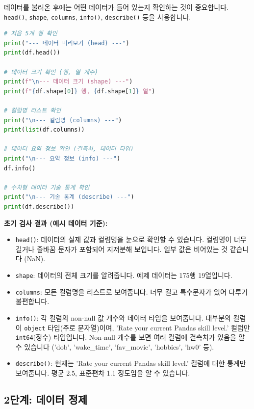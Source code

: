 \documentclass[11pt,a4paper]{book}
\theoremstyle{definition}
\begin{document}
데이터를 불러온 후에는 어떤 데이터가 들어 있는지 확인하는 것이 중요합니다. \texttt{head()}, \texttt{shape}, \texttt{columns}, \texttt{info()}, \texttt{describe()} 등을 사용합니다.

\begin{codeexamplebox}
\begin{lstlisting}[language=Python, caption={데이터 초기 검사}, label={lst:initial_inspection}, breaklines=true]
# 처음 5개 행 확인
print("--- 데이터 미리보기 (head) ---")
print(df.head())

# 데이터 크기 확인 (행, 열 개수)
print(f"\n--- 데이터 크기 (shape) ---")
print(f"{df.shape[0]} 행, {df.shape[1]} 열")

# 컬럼명 리스트 확인
print("\n--- 컬럼명 (columns) ---")
print(list(df.columns))

# 데이터 요약 정보 확인 (결측치, 데이터 타입)
print("\n--- 요약 정보 (info) ---")
df.info()

# 수치형 데이터 기술 통계 확인
print("\n--- 기술 통계 (describe) ---")
print(df.describe())
\end{lstlisting}
\end{codeexamplebox}

\textbf{초기 검사 결과 (예시 데이터 기준):}
\begin{itemize}
    \item \texttt{head()}: 데이터의 실제 값과 컬럼명을 눈으로 확인할 수 있습니다. 컬럼명이 너무 길거나 줄바꿈 문자가 포함되어 지저분해 보입니다. 일부 값은 비어있는 것 같습니다 (NaN).
    \item \texttt{shape}: 데이터의 전체 크기를 알려줍니다. 예제 데이터는 175행 19열입니다.
    \item \texttt{columns}: 모든 컬럼명을 리스트로 보여줍니다. 너무 길고 특수문자가 있어 다루기 불편합니다.
    \item \texttt{info()}: 각 컬럼의 non-null 값 개수와 데이터 타입을 보여줍니다. 대부분의 컬럼이 \texttt{object} 타입(주로 문자열)이며, 'Rate your current Pandas skill level.' 컬럼만 \texttt{int64}(정수) 타입입니다. Non-null 개수를 보면 여러 컬럼에 결측치가 있음을 알 수 있습니다 ('dob', 'wake\_time', 'fav\_movie', 'hobbies', 'hw0' 등).
    \item \texttt{describe()}: 현재는 'Rate your current Pandas skill level.' 컬럼에 대한 통계만 보여줍니다. 평균 2.5, 표준편차 1.1 정도임을 알 수 있습니다.
\end{itemize}


\subsection{2단계: 데이터 정제}
\end{document}
